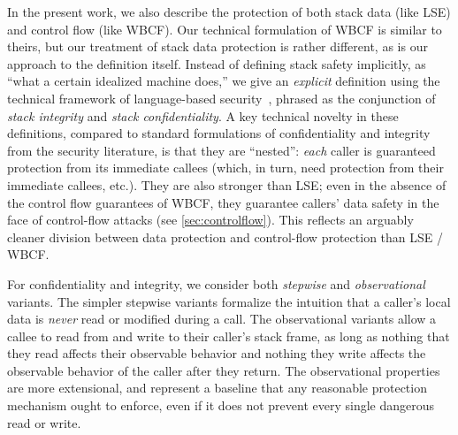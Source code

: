 \documentclass[acmsmall,review,anonymous]{acmart}\settopmatter{printfolios=true,printccs=false,printacmref=false}
\begin{document}
In the present work, we also describe the protection of both stack data (like LSE) and
control flow (like WBCF).  Our technical formulation of WBCF is similar to
theirs, but our treatment of stack data protection is rather different,
as is our approach to the definition itself. Instead of defining stack safety implicitly,
as ``what a certain idealized machine does,'' we give an
\emph{explicit} definition using the technical framework of language-based
security\ifaftersubmission~\citep{??}\fi, phrased as the conjunction of
\emph{stack integrity} and \emph{stack confidentiality}.
%
A key technical novelty in these definitions,
compared to standard formulations of confidentiality and integrity from the
security literature, is that they
are ``nested'': {\em each} caller is guaranteed protection from its
immediate callees (which, in turn, need protection from their immediate
callees, etc.). They are also stronger than LSE; even in the absence of the
control flow guarantees of WBCF, they guarantee callers'
data safety in the face of control-flow attacks (see \cref{sec:controlflow}).
This reflects an arguably cleaner division between data protection and
control-flow protection than LSE / WBCF.

For confidentiality and integrity, we consider both {\em stepwise}
and {\em observational} variants.  The simpler stepwise
variants formalize the intuition that a caller's local data is {\em never}
read or modified during a call. The observational variants
allow a callee to read from and write to their caller's stack frame, as
long as nothing that they read affects their observable behavior and nothing
they write affects the observable behavior of the caller after they return.
The observational properties are more extensional, and represent a baseline
that any reasonable protection mechanism ought to enforce,
even if it does not prevent every single dangerous read or write.

\end{document}
